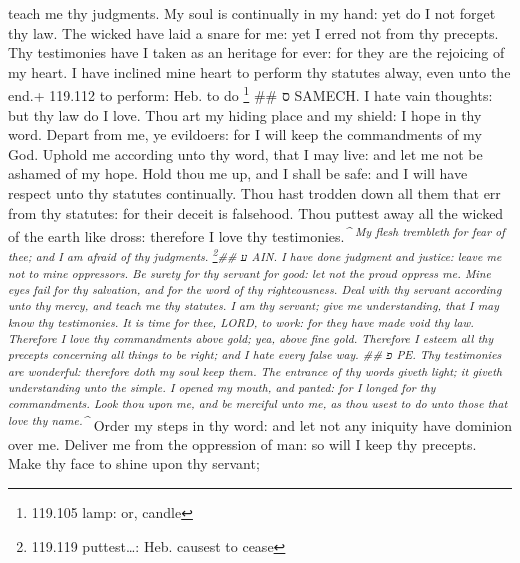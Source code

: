 teach me thy judgments.  My soul is continually in my
hand: yet do I not forget thy law.  The wicked have laid a
snare for me: yet I erred not from thy precepts.  Thy
testimonies have I taken as an heritage for ever: for they are the
rejoicing of my heart.  I have inclined mine heart to
perform thy statutes alway, even unto the end.+ 119.112 to perform: Heb.
to do \footnote{119.105 lamp: or, candle} \#\# ס SAMECH. 
I hate vain thoughts: but thy law do I love.  Thou art my
hiding place and my shield: I hope in thy word.  Depart
from me, ye evildoers: for I will keep the commandments of my God.
 Uphold me according unto thy word, that I may live: and
let me not be ashamed of my hope.  Hold thou me up, and I
shall be safe: and I will have respect unto thy statutes continually.
 Thou hast trodden down all them that err from thy
statutes: for their deceit is falsehood.  Thou puttest
away all the wicked of the earth like dross: therefore I love thy
testimonies.\textsuperscript{\emph{\^{}  My flesh
trembleth for fear of thee; and I am afraid of thy judgments.
\footnote{119.119 puttest\ldots: Heb. causest to cease}\#\# ע AIN.
 I have done judgment and justice: leave me not to mine
oppressors.  Be surety for thy servant for good: let not
the proud oppress me.  Mine eyes fail for thy salvation,
and for the word of thy righteousness.  Deal with thy
servant according unto thy mercy, and teach me thy statutes.
 I am thy servant; give me understanding, that I may know
thy testimonies.  It is time for thee, LORD, to work: for
they have made void thy law.  Therefore I love thy
commandments above gold; yea, above fine gold.  Therefore
I esteem all thy precepts concerning all things to be right; and I hate
every false way. \#\# פ PE.  Thy testimonies are
wonderful: therefore doth my soul keep them.  The entrance
of thy words giveth light; it giveth understanding unto the simple.
 I opened my mouth, and panted: for I longed for thy
commandments.  Look thou upon me, and be merciful unto me,
as thou usest to do unto those that love thy name.\^{}}} 
Order my steps in thy word: and let not any iniquity have dominion over
me.  Deliver me from the oppression of man: so will I keep
thy precepts.  Make thy face to shine upon thy servant;
